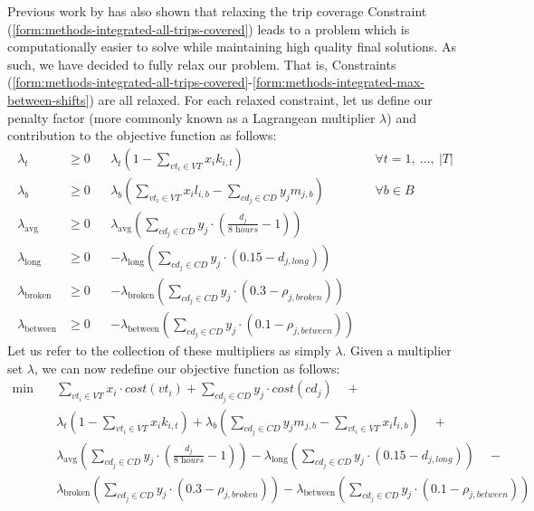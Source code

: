\documentclass[]{article}
\begin{document}
Previous work by \citet{vanKootenNiekerk2017} has also shown that relaxing the trip coverage Constraint (\ref{form:methods-integrated-all-trips-covered}) leads to a problem which is computationally easier to solve while maintaining high quality final solutions. As such, we have decided to fully relax our problem. That is, Constraints (\ref{form:methods-integrated-all-trips-covered}-\ref{form:methods-integrated-max-between-shifts}) are all relaxed. For each relaxed constraint, let us define our penalty factor (more commonly known as a Lagrangean multiplier $\lambda$) and contribution to the objective function as follows: 
\begin{align}
\lambda_{t} &\geq 0 && \lambda_{t} (1 - \sum_{vt_i \in VT} x_{i}k_{i,t}) && \forall t = 1,\:\dots,\:|T| \nonumber \\
\lambda_{b} &\geq 0 && \lambda_{b} (\sum_{vt_i \in VT} x_i l_{i,b} - \sum_{cd_j \in CD}y_j m_{j,b}) && \forall b \in B \nonumber \\
\lambda_{\text{avg}} &\geq 0 && \lambda_{\text{avg}} (\sum_{cd_j \in \textit{CD}} y_{j} \cdot (\frac{d_{j}}{\textit{8 hours}} - 1)) && \nonumber \\
\lambda_{\text{long}} &\geq 0 && -\lambda_{\text{long}} (\sum_{cd_j \in \textit{CD}} y_{j} \cdot (0.15 - d_{j,\textit{long}})) && \nonumber \\
\lambda_{\text{broken}} &\geq 0 && -\lambda_{\text{broken}} (\sum_{cd_j \in \textit{CD}} y_{j} \cdot (0.3 - \rho_{j,\textit{broken}})) && \nonumber \\
\lambda_{\text{between}} &\geq 0 && -\lambda_{\text{between}} (\sum_{cd_j \in \textit{CD}} y_{j} \cdot (0.1 - \rho_{j,\textit{between}})) && \nonumber
\end{align}
Let us refer to the collection of these multipliers as simply $\lambda$. Given a multiplier set $\lambda$, we can now redefine our objective function as follows:
\begin{align}
\min \quad
& \sum_{vt_i \in VT} x_{i} \cdot cost(vt_i) + \sum_{cd_j \in CD} y_{j} \cdot cost(cd_j)\quad+ \nonumber \\ 
&\lambda_{t} (1 - \sum_{vt_i \in VT} x_{i}k_{i,t}) + \lambda_{b} (\sum_{cd_j \in CD}y_j m_{j,b} - \sum_{vt_i \in VT}x_i l_{i,b}) \quad+\nonumber \\
&\lambda_{\text{avg}} (\sum_{cd_j \in \textit{CD}} y_{j} \cdot (\frac{d_{j}}{\textit{8 hours}} - 1)) -\lambda_{\text{long}} (\sum_{cd_j \in \textit{CD}} y_{j} \cdot (0.15 - d_{j,\textit{long}}))\quad- \nonumber \\
&\lambda_{\text{broken}}(\sum_{cd_j \in \textit{CD}} y_{j} \cdot (0.3 - \rho_{j,\textit{broken}})) -\lambda_{\text{between}} (\sum_{cd_j \in \textit{CD}} y_{j} \cdot (0.1 - \rho_{j,\textit{between}})) \nonumber
\end{align}
\end{document}
